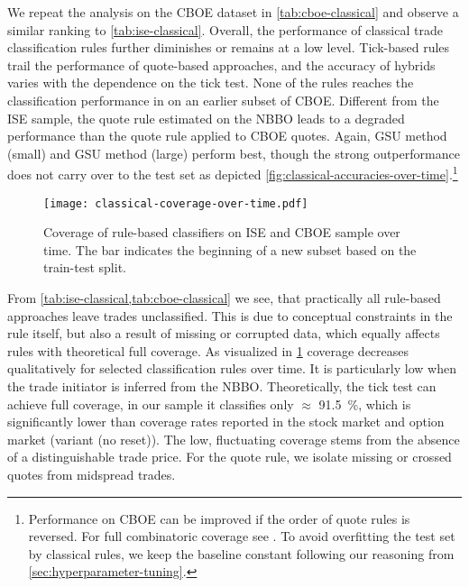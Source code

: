 We repeat the analysis on the \gls{CBOE} dataset in \cref{tab:cboe-classical} and observe a similar ranking to \cref{tab:ise-classical}. Overall, the performance of classical trade classification rules further diminishes or remains at a low level. Tick-based rules trail the performance of quote-based approaches, and the accuracy of hybrids varies with the dependence on the tick test. None of the rules reaches the classification performance in \textcite[][886]{savickasInferringDirectionOption2003} on an earlier subset of \gls{CBOE}. Different from the \gls{ISE} sample, the quote rule estimated on the \gls{NBBO} leads to a degraded performance than the quote rule applied to \gls{CBOE} quotes. Again, \gls{GSU} method (small) and \gls{GSU} method (large) perform best, though the strong outperformance does not carry over to the test set as depicted \cref{fig:classical-accuracies-over-time}.\footnote{Performance on \gls{CBOE} can be improved if the order of quote rules is reversed. For full combinatoric coverage see \textcite[][44]{grauerOptionTradeClassification2022}. To avoid overfitting the test set by classical rules, we keep the baseline constant following our reasoning from \cref{sec:hyperparameter-tuning}.}

\begin{figure}[!ht]
    \centering
    \texttt{[image: classical-coverage-over-time.pdf]}
    \caption[Coverage of Rule-Based Classifiers Over Time]{Coverage of rule-based classifiers on \gls{ISE} and \gls{CBOE} sample over time. The bar \myline{} indicates the beginning of a new subset based on the train-test split.}
    \label{fig:classical-coverage-over-time}
\end{figure}

From \cref{tab:ise-classical,tab:cboe-classical} we see, that practically all rule-based approaches leave trades unclassified. This is due to conceptual constraints in the rule itself, but also a result of missing or corrupted data, which equally affects rules with theoretical full coverage. As visualized in \cref{fig:classical-coverage-over-time} coverage decreases qualitatively for selected classification rules over time. It is particularly low when the trade initiator is inferred from the \gls{NBBO}. Theoretically, the tick test can achieve full coverage, in our sample it classifies only $\approx$ \SI{91.5}{\percent}, which is significantly lower than coverage rates reported in the stock market \autocite[][535]{ellisAccuracyTradeClassification2000} and option market \autocite[][886]{savickasInferringDirectionOption2003} (variant (no reset)). The low, fluctuating coverage stems from the absence of a distinguishable trade price. For the quote rule, we isolate missing or crossed quotes from midspread trades. 

